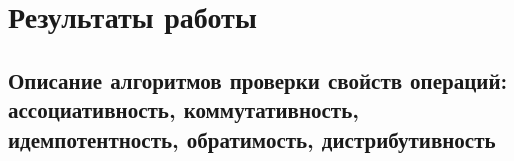 \documentclass[bachelor, och, labwork]{shiza}
\begin{document}


        
            




\section{Результаты работы}
    \subsection{Описание алгоритмов проверки свойств операций: ассоциативность, коммутативность, идемпотентность, обратимость, дистрибутивность}
    
\end{document}
